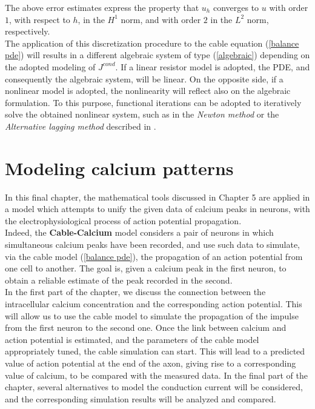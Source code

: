\documentclass[12pt, a4paper]{report}
\begin{document}
The above error estimates express the property that $u_h$ converges to $u$ with order $1$, with respect to $h$, in the $H^1$ norm, and with order $2$ in the $L^2$ norm, respectively.\\
The application of this discretization procedure to the cable equation (\ref{balance pde}) will results in a different algebraic system of type (\ref{algebraic}) depending on the adopted modeling of  $J^{cond}$. If a linear resistor model is adopted, the PDE, and consequently the algebraic system, will be linear. On the opposite side, if a nonlinear model is adopted, the nonlinearity will reflect also on the algebraic formulation. To this purpose, functional iterations can be adopted to iteratively solve the obtained nonlinear system, such as in the \textit{Newton method} or the \textit{Alternative lagging method} described in \cite{35}.

\newpage

\chapter{Modeling calcium patterns}

In this final chapter, the mathematical tools discussed in Chapter 5 are applied in a model which attempts to unify the given data of calcium peaks in neurons, with the electrophysiological process of action potential propagation.\\
Indeed, the \textbf{Cable-Calcium} model considers a pair of neurons in which simultaneous calcium peaks have been recorded, and use such data to simulate, via the cable model (\ref{balance pde}), the propagation of an action potential from one cell to another. The goal is, given a calcium peak in the first neuron, to obtain a reliable estimate of the peak recorded in the second.\\ 
In the first part of the chapter, we discuss the connection between the intracellular calcium concentration and the corresponding action potential. This will allow us to use the cable model to simulate the propagation of the impulse from the first neuron to the second one. Once the link between calcium and action potential is estimated, and the parameters of the cable model appropriately tuned, the cable simulation can start. This will lead to a predicted value of action potential at the end of the axon, giving rise to a corresponding value of calcium, to be compared with the measured data. In the final part of the chapter, several alternatives to model the conduction current will be considered, and the corresponding simulation results will be analyzed and compared.
\end{document}
